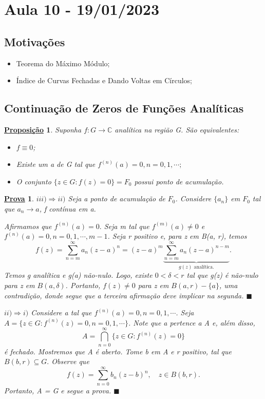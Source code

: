 \documentclass{article}
\newtheorem*{proof*}{\underline{Prova}}
\newtheorem*{prop*}{\underline{Proposi\c c\~ao}}
\renewcommand\qedsymbol{$\blacksquare$}
\begin{document}
\section{Aula 10 - 19/01/2023}
\subsection{Motiva\c c\~oes}
\begin{itemize}
  \item Teorema do M\'aximo M\'odulo;
  \item \'Indice de Curvas Fechadas e Dando Voltas em C\'irculos;
\end{itemize}

\subsection{Continua\c c\~ao de Zeros de Fun\c c\~oes Anal\'iticas}
\begin{prop*}
  Suponha $f:G\rightarrow \mathbb{C}$ anal\'itica na regi\~ao G. S\~ao equivalentes:
 \begin{itemize}
   \item[i)] $f\equiv0$;
   \item[ii)] Existe um a de G tal que $f^{(n)}(a) = 0, n = 0, 1, \cdots;$
   \item[iii)] O conjunto $\{z\in{G}: f(z) = 0\} = F_{0} $ possui ponto de acumula\c c\~ao.
 \end{itemize}
\end{prop*}
\begin{proof*}
 $iii)\Rightarrow ii)$ Seja a ponto de acumula\c c\~ao de $F_{0}$. Considere $\{a_{n}\} $ em $F_{0}$ tal que $a_{n}\to{a}$, f cont\'inua em a.

  Afirmamos que $f^{(n)}(a) = 0.$  Seja m tal que $f^{(m)}(a)\neq 0 $ e $f^{(n)}(a) = 0, n = 0, 1, \cdots, m-1 $. Seja r positivo
e, para z em B(a, r), temos 
  $$
  f(z) = \sum\limits_{n=m}^{\infty}a_{n}(z-a)^{n} = (z-a)^{m}\underbrace{\sum\limits_{n=m}^{\infty}a_{n}(z-a)^{n-m}}_{g(z)\text{ anal\'itica.}}.
  $$
  Temos g anal\'itica e g(a) n\~ao-nulo. Logo, existe $0 < \delta < r$ tal que g(z) \'e n\~ao-nulo para z em $B(a, \delta)$. Portanto,
  $f(z)\neq0$ para z em $B(a, r) - \{a\} $, uma contradi\c c\~ao, donde segue que a terceira afirma\c c\~ao deve implicar na segunda. \qedsymbol

  $ii)\Rightarrow i)$ Considere a tal que $f^{(n)}(a) = 0, n = 0, 1, \cdots$. Seja $A=\{z\in{G}: f^{(n)}(z) = 0, n=0, 1, \cdots\} $. Note que
a pertence a A e, al\'em disso, 
  $$
  A = \bigcap_{n=0}^{\infty}\{z\in{G}: f^{(n)}(z) = 0\}
  $$
\'e fechado. Mostremos que A \'e aberto. Tome b em A e r positivo, tal que $B(b, r)\subseteq{G}.$ Observe que 
 $$
 f(z) = \sum\limits_{n=0}^{\infty}b_{n}(z-b)^{n}, \quad z\in{B(b, r)}.
 $$
 Portanto, A = G e segue a prova. \qedsymbol
\end{proof*}
\end{document}
